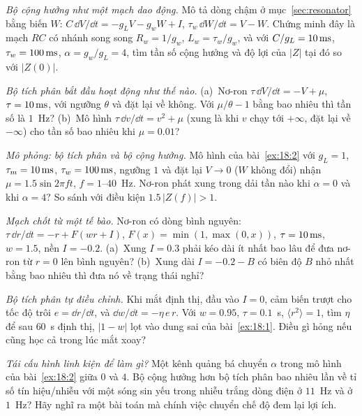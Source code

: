 \begin{exercise}[\lvlB]
\label{ex:18:2}
\emph{Bộ cộng hưởng như một mạch dao động.} Mô tả dòng chậm ở mục~\ref{sec:resonator} bằng biến $W$: $C\,\dd V/\dd t=-g_LV-g_wW+I$, $\tau_w\,\dd W/\dd t=V-W$. Chứng minh đây là mạch $RC$ có nhánh song song $R_w=1/g_w$, $L_w=\tau_w/g_w$, và với $C/g_L=10\,\text{ms}$, $\tau_w=100\,\text{ms}$, $\alpha=g_w/g_L=4$, tìm tần số cộng hưởng và độ lợi của $|Z|$ tại đó so với $|Z(0)|$.
\end{exercise}

\begin{exercise}[\lvlB]
\label{ex:18:3}
\emph{Bộ tích phân bắt đầu hoạt động như thế nào.} (a)~Nơ-ron $\tau\,\dd V/\dd t=-V+\mu$, $\tau=10\,\text{ms}$, với ngưỡng $\theta$ và đặt lại về không. Với $\mu/\theta-1$ bằng bao nhiêu thì tần số là $1$~Hz? (b)~Mô hình $\tau\,\dd v/\dd t=v^2+\mu$ (xung là khi $v$ chạy tới $+\infty$, đặt lại về $-\infty$) cho tần số bao nhiêu khi $\mu=0.01$?
\end{exercise}

\begin{exercise}[\lvlB]
\label{ex:18:4}
\emph{Mô phỏng: bộ tích phân và bộ cộng hưởng.} Mô hình của bài~\ref{ex:18:2} với $g_L=1$, $\tau_m=10\,\text{ms}$, $\tau_w=100\,\text{ms}$, ngưỡng $1$ và đặt lại $V\to0$ ($W$ không đổi) nhận $\mu=1.5\sin2\pi ft$, $f=1$--$40$~Hz. Nơ-ron phát xung trong dải tần nào khi $\alpha=0$ và khi $\alpha=4$? So sánh với điều kiện $1.5\,|Z(f)|>1$.
\end{exercise}

\begin{exercise}[\lvlB]
\label{ex:18:5}
\emph{Mạch chốt từ một tế bào.} Nơ-ron có dòng bình nguyên: $\tau\,\dd r/\dd t=-r+F(wr+I)$, $F(x)=\min(1,\max(0,x))$, $\tau=10\,\text{ms}$, $w=1.5$, nền $I=-0.2$. (a)~Xung $I=0.3$ phải kéo dài ít nhất bao lâu để đưa nơ-ron từ $r=0$ lên bình nguyên? (b)~Xung dài $I=-0.2-B$ có biên độ $B$ nhỏ nhất bằng bao nhiêu thì đưa nó về trạng thái nghỉ?
\end{exercise}

\begin{exercise}[\lvlB]
\label{ex:18:6}
\emph{Bộ tích phân tự điều chỉnh.} Khi mắt định thị, đầu vào $I=0$, cảm biến trượt cho tốc độ trôi $e=\dd r/\dd t$, và $\dd w/\dd t=-\eta\,e\,r$. Với $w=0.95$, $\tau=0.1$~s, $\langle r^2\rangle=1$, tìm $\eta$ để sau $60$~s định thị, $|1-w|$ lọt vào dung sai của bài~\ref{ex:18:1}. Điều gì hỏng nếu cũng học cả trong lúc mắt xoay?
\end{exercise}

\begin{exercise}[\lvlC]
\label{ex:18:7}
\emph{Tái cấu hình linh kiện để làm gì?} Một kênh quảng bá chuyển $\alpha$ trong mô hình của bài~\ref{ex:18:2} giữa $0$ và $4$. Bộ cộng hưởng hơn bộ tích phân bao nhiêu lần về tỉ số tín hiệu/nhiễu với một sóng sin yếu trong nhiễu trắng dòng điện ở $11$~Hz và ở $1$~Hz? Hãy nghĩ ra một bài toán mà chính việc chuyển chế độ đem lại lợi ích.
\end{exercise}
